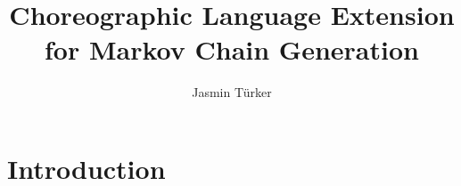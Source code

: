 \documentclass[
	ngerman,
	ruledheaders=section,%
	class=report,%
	thesis={type=master},%
	accentcolor=1d,%
	custommargins=true,%
	marginpar=false,%
	parskip=half-,%
	fontsize=11pt,%
]{tudapub}
\begin{document}

\title{Choreographic Language Extension for Markov Chain Generation}

\author[]{Jasmin Türker}%



\submissiondate{\today}
\examdate{\today}



\maketitle

 \affidavit[digital] %


\tableofcontents

\chapter{Introduction}
\label{ch:introduction}

\end{document}
